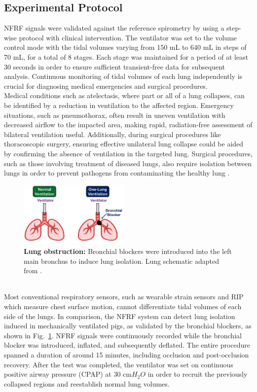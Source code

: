 \documentclass[journal,twoside,web]{ieeecolor}
\begin{document}
\subsection{Experimental Protocol}
NFRF signals were validated against the reference spirometry by using a step-wise protocol with clinical intervention. The ventilator was set to the volume control mode with the tidal volumes varying from 150 mL to 640 mL in steps of 70 mL, for a total of 8 stages. Each stage was maintained for a period of at least 30 seconds in order to ensure sufficient transient-free data for subsequent analysis. Continuous monitoring of tidal volumes of each lung independently is crucial for diagnosing medical emergencies and surgical procedures. \\
Medical conditions such as atelectasis, where part or all of a lung collapses, can be identified by a reduction in ventilation to the affected region. Emergency situations, such as pneumothorax, often result in uneven ventilation with decreased airflow to the impacted area, making rapid, radiation-free assessment of bilateral ventilation useful. Additionally, during surgical procedures like thoracoscopic surgery, ensuring effective unilateral lung collapse could be aided by confirming the absence of ventilation in the targeted lung. Surgical procedures, such as those involving treatment of diseased lungs, also require isolation between lungs in order to prevent pathogens from contaminating the healthy lung \cite{smithLungIsolationAnesthesia2024}. 
\begin{figure}[htpb]
\centering
\includegraphics[width=0.48\textwidth]{occlusion.jpg}
\caption{\textbf{Lung obstruction:} Bronchial blockers were introduced into the left main bronchus to induce lung isolation. Lung schematic adapted from \cite{lungImage}.}
\label{fig:occlusion}
\end{figure}\\
Most conventional respiratory sensors, such as wearable strain sensors and RIP which measure chest surface motion, cannot differentiate tidal volumes of each side of the lungs. In comparison, the NFRF system can detect lung isolation induced in mechanically ventilated pigs, as validated by the bronchial blockers, as shown in Fig.~\ref{fig:occlusion}. NFRF signals were continuously recorded while the bronchial blocker was introduced, inflated, and subsequently deflated. The entire procedure spanned a duration of around 15 minutes, including occlusion and post-occlusion recovery. After the test was completed, the ventilator was set on continuous positive airway pressure (CPAP) at 30 cm$H_{2}O$ in order to recruit the previously collapsed regions and reestablish normal lung volumes.  
\end{document}
